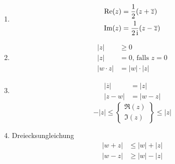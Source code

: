 \begin{enumerate}

\item
  \begin{align*}
  \operatorname{Re}(z) & = \frac{1}{2} (z+\overline{z}) \\
  \operatorname{Im}(z) & = \frac{1}{2\operatorname{i}} (z - \overline{z})
  \end{align*}

\item
  \begin{align*}
  |z| & \geq 0 \\
  |z| & = 0 \text{, falls } z=0 \\
  |w\cdot z| & = |w| \cdot |z|
  \end{align*}

\item
  \begin{align*}
  |\overline{z}| & = |z| \\
  |z - w| & = |w - z|
  \end{align*}
  \[ -|z| \leq \left\{ \begin{array}{c}\Re(z) \\ \Im(z)\end{array} \right\} \leq |z| \]

\item Dreiecksungleichung
  \begin{align*}
  |w + z| & \leq |w| + |z| \\
  |w - z| & \geq |w| - |z|
  \end{align*}
\end{enumerate}


